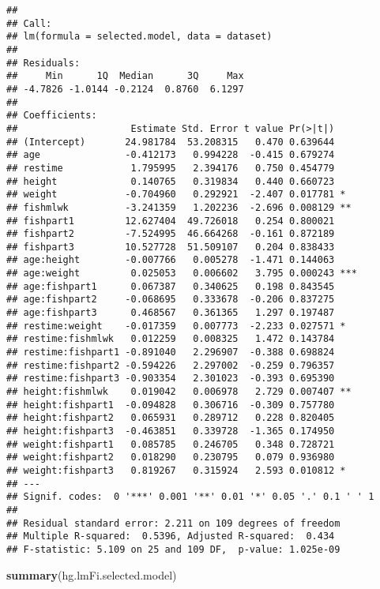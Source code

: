 \documentclass[12pt,]{article}
\newenvironment{Shaded}{\begin{snugshade}}{\end{snugshade}}
\newcommand{\KeywordTok}[1]{\textcolor[rgb]{0.13,0.29,0.53}{\textbf{#1}}}
\newcommand{\NormalTok}[1]{#1}
\begin{document}
\begin{verbatim}
## 
## Call:
## lm(formula = selected.model, data = dataset)
## 
## Residuals:
##     Min      1Q  Median      3Q     Max 
## -4.7826 -1.0144 -0.2124  0.8760  6.1297 
## 
## Coefficients:
##                    Estimate Std. Error t value Pr(>|t|)    
## (Intercept)       24.981784  53.208315   0.470 0.639644    
## age               -0.412173   0.994228  -0.415 0.679274    
## restime            1.795995   2.394176   0.750 0.454779    
## height             0.140765   0.319834   0.440 0.660723    
## weight            -0.704960   0.292921  -2.407 0.017781 *  
## fishmlwk          -3.241359   1.202236  -2.696 0.008129 ** 
## fishpart1         12.627404  49.726018   0.254 0.800021    
## fishpart2         -7.524995  46.664268  -0.161 0.872189    
## fishpart3         10.527728  51.509107   0.204 0.838433    
## age:height        -0.007766   0.005278  -1.471 0.144063    
## age:weight         0.025053   0.006602   3.795 0.000243 ***
## age:fishpart1      0.067387   0.340625   0.198 0.843545    
## age:fishpart2     -0.068695   0.333678  -0.206 0.837275    
## age:fishpart3      0.468567   0.361365   1.297 0.197487    
## restime:weight    -0.017359   0.007773  -2.233 0.027571 *  
## restime:fishmlwk   0.012259   0.008325   1.472 0.143784    
## restime:fishpart1 -0.891040   2.296907  -0.388 0.698824    
## restime:fishpart2 -0.594226   2.297002  -0.259 0.796357    
## restime:fishpart3 -0.903354   2.301023  -0.393 0.695390    
## height:fishmlwk    0.019042   0.006978   2.729 0.007407 ** 
## height:fishpart1  -0.094828   0.306716  -0.309 0.757780    
## height:fishpart2   0.065931   0.289712   0.228 0.820405    
## height:fishpart3  -0.463851   0.339728  -1.365 0.174950    
## weight:fishpart1   0.085785   0.246705   0.348 0.728721    
## weight:fishpart2   0.018290   0.230795   0.079 0.936980    
## weight:fishpart3   0.819267   0.315924   2.593 0.010812 *  
## ---
## Signif. codes:  0 '***' 0.001 '**' 0.01 '*' 0.05 '.' 0.1 ' ' 1
## 
## Residual standard error: 2.211 on 109 degrees of freedom
## Multiple R-squared:  0.5396, Adjusted R-squared:  0.434 
## F-statistic: 5.109 on 25 and 109 DF,  p-value: 1.025e-09
\end{verbatim}

\begin{Shaded}
\begin{Highlighting}[]
\KeywordTok{summary}\NormalTok{(hg.lmFi.selected.model)}
\end{Highlighting}
\end{Shaded}
\end{document}
